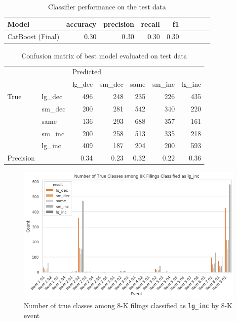 \documentclass{article}
\begin{document}
	\begin{table}[h!]
	\centering
	\caption{Classifier performance on the test data}
	\label{table:results_test}
	
	\begin{tabular}{lrrrrrrrr}
		\toprule
		Model &     accuracy &     precision &     recall &    f1 \\
		\midrule
		CatBoost (Final)   &  0.30 &  0.30 &   0.30 &  0.30 \\
		\bottomrule
	\end{tabular}
	
	\end{table}%


	\begin{table}[h!]
	\centering
	\caption{Confusion matrix of best model evaluated on test data}
	\label{table:best_model_cm_abs}
	
	\begin{tabular}{llrrrrr}
		\toprule
		&        & \multicolumn{5}{l}{Predicted} \\
		&        &    lg\_dec & sm\_dec & same & sm\_inc & lg\_inc \\
		\midrule
		True & lg\_dec &       496 &    248 &  235 &    226 &    435 \\
		& sm\_dec &       200 &    281 &  542 &    340 &    220 \\
		& same &       136 &    293 &  688 &    357 &    161 \\
		& sm\_inc &       200 &    258 &  513 &    335 &    218 \\
		& lg\_inc &       409 &    187 &  204 &    200 &    593 \\
\bottomrule
		Precision &  &    0.34 &  0.23 &  0.32 &   0.22 &    0.36 \\
		\bottomrule
	\end{tabular}

	\end{table}%

	\begin{figure}[h!]
		\includegraphics[width=\linewidth]{img/class_by_lg_dec.png}
		\caption{Number of true classes among 8-K filings classified as \lstinline{lg_inc} by 8-K event}
		\label{fig:class_by_lg_dec}
	\end{figure}
\end{document}
